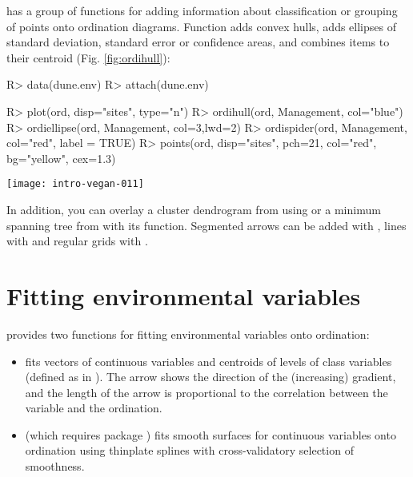 \documentclass[article,nojss]{jss}
\begin{document}
 has a group of functions for adding information about
classification or grouping of points onto ordination diagrams.
Function  adds convex hulls, 
adds ellipses of standard deviation, standard error or confidence
areas, and  combines items to their centroid
(Fig. \ref{fig:ordihull}):
\begin{Schunk}
\begin{Sinput}
R> data(dune.env)
R> attach(dune.env)
\end{Sinput}
\end{Schunk}
\begin{Schunk}
\begin{Sinput}
R> plot(ord, disp="sites", type="n")
R> ordihull(ord, Management, col="blue")
R> ordiellipse(ord, Management, col=3,lwd=2)
R> ordispider(ord, Management, col="red", label = TRUE)
R> points(ord, disp="sites", pch=21, col="red", bg="yellow", cex=1.3)
\end{Sinput}
\end{Schunk}
\begin{SCfigure}
\texttt{[image: intro-vegan-011]}
\caption{Convex hull, standard error ellipse and a spider web diagram
  for Management levels in ordination.}
\label{fig:ordihull}
\end{SCfigure}
In addition, you can overlay a cluster dendrogram from 
using  or a minimum spanning tree from
 with its  function.  Segmented arrows
can be added with , lines with
 and regular grids with .

\section{Fitting environmental variables}

 provides two functions for fitting environmental
variables onto ordination:
\begin{itemize}
\item {} fits vectors of continuous variables and centroids
  of levels of class variables (defined as  in
  ).  The arrow shows the direction of the (increasing)
  gradient, and the length of the arrow is proportional to the
  correlation between the variable and the ordination.
\item {} (which requires package ) fits
  smooth surfaces for continuous variables onto ordination using
  thinplate splines with cross-validatory selection of smoothness.
\end{itemize}
\end{document}
